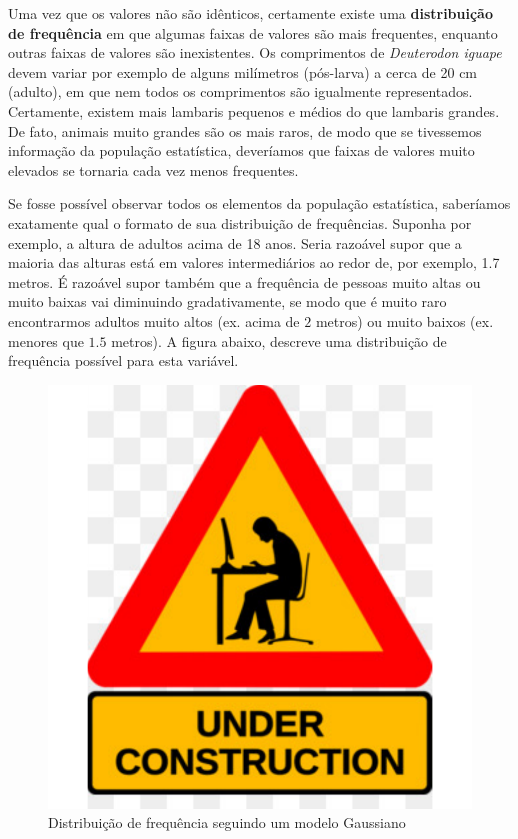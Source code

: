 \documentclass[
]{book}
\begin{document}
Uma vez que os valores não são idênticos, certamente existe uma \textbf{distribuição de frequência} em que algumas faixas de valores são mais frequentes, enquanto outras faixas de valores são inexistentes. Os comprimentos de \emph{Deuterodon iguape} devem variar por exemplo de alguns milímetros (pós-larva) a cerca de 20 cm (adulto), em que nem todos os comprimentos são igualmente representados. Certamente, existem mais lambaris pequenos e médios do que lambaris grandes. De fato, animais muito grandes são os mais raros, de modo que se tivessemos informação da população estatística, deveríamos que faixas de valores muito elevados se tornaria cada vez menos frequentes.

Se fosse possível observar todos os elementos da população estatística, saberíamos exatamente qual o formato de sua distribuição de frequências. Suponha por exemplo, a altura de adultos acima de 18 anos. Seria razoável supor que a maioria das alturas está em valores intermediários ao redor de, por exemplo, 1.7 metros. É razoável supor também que a frequência de pessoas muito altas ou muito baixas vai diminuindo gradativamente, se modo que é muito raro encontrarmos adultos muito altos (ex. acima de \(2\) metros) ou muito baixos (ex. menores que \(1.5\) metros). A figura abaixo, descreve uma distribuição de frequência possível para esta variável.

\begin{figure}

{\centering \includegraphics{probest-cambientais_files/figure-latex/unnamed-chunk-235-1} 

}

\caption{Distribuição de frequência seguindo um modelo Gaussiano}\label{fig:unnamed-chunk-235}
\end{figure}
\end{document}
